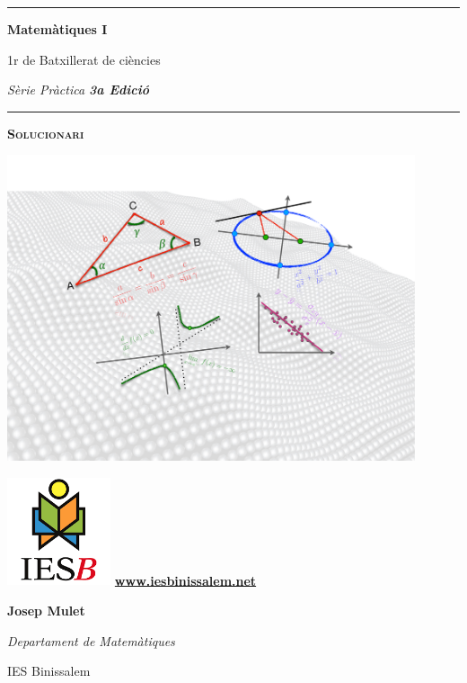 \documentclass[a4paper, pdf, twoside]{book}
\begin{document}
\thispagestyle{empty}
\pagestyle{plain}
\renewcommand{\headrulewidth}{0pt}
\begin{center}
\vspace*{0.5cm}\hrule\vspace{0.5cm}
\Huge \textbf{Matemàtiques I} \par
\Large 1r de Batxillerat de ciències\par
\large \textit{Sèrie Pràctica \textbf{3a Edició}}\par
\vspace{0.5cm}\hrule\vspace{0.5cm}
\Huge \textbf{\textsc{Solucionari}} \par \vspace{1.5cm}
	\includegraphics[width=0.9\textwidth]{img-00/portada}   

	\vspace{1.5cm}  
	\begin{minipage}{0.4\textwidth}  
		\begin{center}  
			\includegraphics*[width=1.2in]{img-00/ies-binissalem-logo}  
			\small  
			\noindent \href{www.iesbinissalem.net}{\textbf{www.iesbinissalem.net}}  
		\end{center}  
	\end{minipage}  
	\begin{minipage}{0.4\textwidth}  
		\begin{flushright}  
			\normalsize \textbf{Josep Mulet}\par 
			\textit{Departament de Matemàtiques}\par   
			IES Binissalem  
		\end{flushright}  
	\end{minipage}   
	\end{center}   
\end{document}
